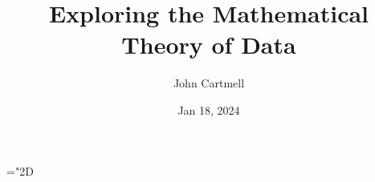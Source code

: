
\usepackage{mathptmx}
\usepackage{amsfonts}
\usepackage{wasysym}
\usepackage{url}
\usepackage{hyperref}

\newcommand{\sharedmacros}{../../../SharedMacros}













\renewcommand{\erpictureFolder}[0]{../../../SharedPictures}
\setcounter{equation}{0}

\makeatletter
\newcommand{\xRightarrow}[2][]{\ext@arrow 0359\Rightarrowfill@{#1}{#2}}
\makeatother


\title[John Cartmell]{Exploring the Mathematical Theory of Data}

\author{John Cartmell}
\institute{\\}
\date{Jan 18, 2024}

\usepackage{framed}
\usepackage{bibentry}
\usepackage{colortbl}
\usepackage{ulem}   %
\usepackage{soul,xcolor} %

\usepackage{listings}
\usepackage{arydshln} %
\usepackage{pst-arrow} %





\newcommand{\fgsourcediag}{$\binarysourcediag{a}{b}{c}{f}{g}$}
\newcommand{\rangeplus}{RR.5 range } %
\newcommand{\datacat}{$\gamma$-structured category}
\newcommand{\datacatw}{\datacat\ }
\mathchardef\localjchyphen="2D
\newtheorem{construction}[theorem]{Construction}

\newcommand{\IfSforGammaCwithRCwords}{
If $S$ is a sketch for \datacatw \catcw considered as a data specification with requirement $\reqtc$\ }
\newcommand{\IfSforGammaCwithRCwordsvariant}{
If $S$ is a sketch for \datacatw  \catcw and if $S$ is considered as a data specification with requirement $\reqtc$\ }



